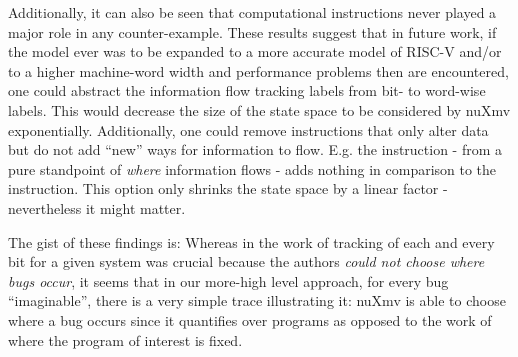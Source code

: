 Additionally, it can also be seen that computational instructions never played a major role in any counter-example.
These results suggest that in future work, if the model ever was to be expanded to a more accurate model of RISC-V and/or to a higher machine-word width and performance problems then are encountered, one could abstract the information flow tracking labels from bit- to word-wise labels.
This would decrease the size of the state space to be considered by nuXmv exponentially.
Additionally, one could remove instructions that only alter data but do not add \enquote{new} ways for information to flow.
E.g. the  instruction - from a pure standpoint of \textit{where} information flows - adds nothing in comparison to the  instruction.
This option only shrinks the state space by a linear factor - nevertheless it might matter.

The gist of these findings is:
Whereas in the work of \citeauthor{Ferraiuolo17} \cite{Ferraiuolo17} tracking of each and every bit for a given system was crucial because the authors \textit{could not choose where bugs occur}, it seems that in our more-high level approach, for every bug \enquote{imaginable}, there is a very simple trace illustrating it: nuXmv is able to choose where a bug occurs since it quantifies over programs as opposed to the work of \citeauthor{Ferraiuolo17} where the program of interest is fixed.
